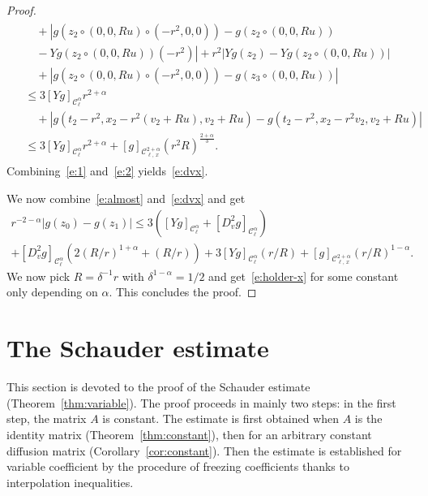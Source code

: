 \documentclass[10pt]{amsart}
\theoremstyle{definition}\newtheorem{defi}[theo]{Definition}\newtheorem{rema}[theo]{Remark}\newtheorem{exam}[theo]{Example}\newtheorem{exem}[theo]{Example}\newtheorem{nota}[theo]{Notation}
\newcommand{\cC}{\mathcal{C}}
\begin{document}
\begin{proof}
\begin{multline}
\begin{aligned}
&\quad + \left|g\left(z_2 \circ (0,0,Ru) \circ (-r^2,0,0)\right) - g\left(z_2 \circ (0,0,Ru)\right)\right.\\
&\left.\quad - Yg \left(z_2 \circ (0,0,Ru)\right)(-r^2) \right| + r^2 \left|Yg (z_2) - Yg \left(z_2 \circ (0,0,Ru)\right)\right| \\
&\quad + \left| g \left(z_2 \circ (0,0,Ru) \circ (-r^2, 0,0)\right) - g\left(z_3 \circ (0,0,Ru)\right)\right|\\
& \le 3 [Yg]_{\cC^\alpha_\ell } r^{2+\alpha} \\
&\quad + \left| g\left(t_2 -r^2,x_2 -r^2 (v_2 + Ru), v_2 + Ru\right) - g\left(t_2-r^2, x_2 -r^2 v_2, v_2 + Ru\right) \right|\\
& \le 3 [Yg]_{\cC^\alpha_\ell} r^{2+\alpha} + [g]_{\cC^{2+\alpha}_{\ell,\,x}} (r^2 R)^{\frac{2+\alpha}3}.
\end{aligned}
\end{multline}
Combining~\eqref{e:1} and~\eqref{e:2} yields~\eqref{e:dvx}.

We now combine~\eqref{e:almost} and~\eqref{e:dvx} and get
\begin{multline*}
r^{-2-\alpha}\left|g(z_0)-g(z_1)\right| \le 3\left([Yg]_{\cC^\alpha_\ell} + \left[D^2_v g\right]_{\cC^\alpha_\ell}\right) \\
+ \left[D^2_v g\right]_{\cC^\alpha_\ell} \left(2 (R/r)^{1+\alpha} + (R/r)\right)
+ 3 [Yg]_{\cC^\alpha_\ell} (r/R) + [g]_{\cC^{2+\alpha}_{\ell,\,x}} (r/R)^{1-\alpha}.
\end{multline*}
We now pick $R = \delta^{-1} r$ with $\delta^{1-\alpha} = 1/2$ and get~\eqref{e:holder-x} for some constant only depending on $\alpha$. This concludes the proof.
\end{proof}


\section{The Schauder estimate}\label{sec:schauder}

This section is devoted to the proof of the Schauder estimate (Theorem~\ref{thm:variable}). The proof proceeds in mainly two steps: in the first step, the matrix $A$ is constant. The estimate is first obtained when $A$ is the identity matrix (Theorem~\ref{thm:constant}), then for an arbitrary constant diffusion matrix (Corollary~\ref{cor:constant}). Then the estimate is established for variable coefficient by the procedure of freezing coefficients thanks to interpolation inequalities.
\end{document}
